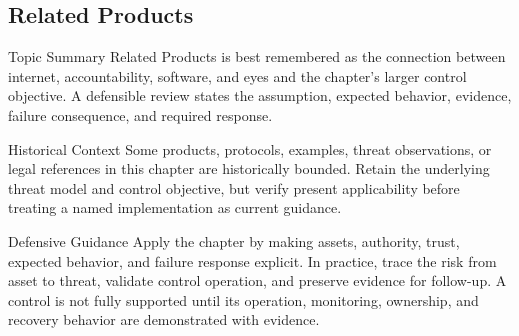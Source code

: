 \documentclass[11pt,letterpaper]{article}
\begin{document}
\subsection*{Related Products}
\begin{CornellNotesTable}
\end{CornellNotesTable}
\begin{CornellSummaryBox}{Topic Summary}
Related Products is best remembered as the connection between internet, accountability, software, and eyes and the chapter's larger control objective. A defensible review states the assumption, expected behavior, evidence, failure consequence, and required response.
\end{CornellSummaryBox}
\begin{CornellWarningBox}{Historical Context}
Some products, protocols, examples, threat observations, or legal references in this chapter are historically bounded. Retain the underlying threat model and control objective, but verify present applicability before treating a named implementation as current guidance.
\end{CornellWarningBox}
\begin{CornellOverviewBox}{Defensive Guidance}
Apply the chapter by making assets, authority, trust, expected behavior, and failure response explicit. In practice, trace the risk from asset to threat, validate control operation, and preserve evidence for follow-up. A control is not fully supported until its operation, monitoring, ownership, and recovery behavior are demonstrated with evidence.
\end{CornellOverviewBox}
\end{document}
